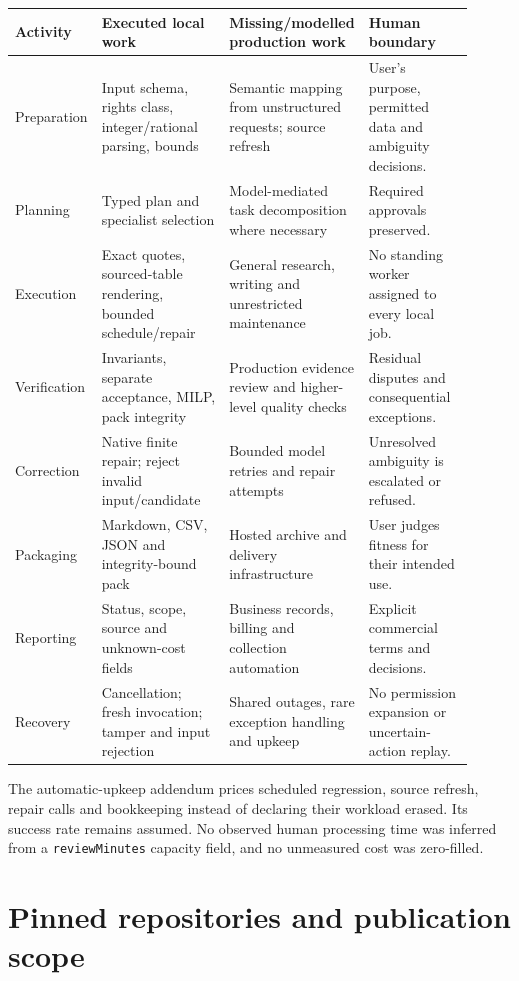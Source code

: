 \begin{longtable}{@{}p{0.14\linewidth}p{0.29\linewidth}p{0.25\linewidth}p{0.23\linewidth}@{}}\toprule
Activity & Executed local work & Missing/modelled production work & Human boundary\\\midrule\endhead
Preparation & Input schema, rights class, integer/rational parsing, bounds & Semantic mapping from unstructured requests; source refresh & User's purpose, permitted data and ambiguity decisions.\\
Planning & Typed plan and specialist selection & Model-mediated task decomposition where necessary & Required approvals preserved.\\
Execution & Exact quotes, sourced-table rendering, bounded schedule/repair & General research, writing and unrestricted maintenance & No standing worker assigned to every local job.\\
Verification & Invariants, separate acceptance, MILP, pack integrity & Production evidence review and higher-level quality checks & Residual disputes and consequential exceptions.\\
Correction & Native finite repair; reject invalid input/candidate & Bounded model retries and repair attempts & Unresolved ambiguity is escalated or refused.\\
Packaging & Markdown, CSV, JSON and integrity-bound pack & Hosted archive and delivery infrastructure & User judges fitness for their intended use.\\
Reporting & Status, scope, source and unknown-cost fields & Business records, billing and collection automation & Explicit commercial terms and decisions.\\
Recovery & Cancellation; fresh invocation; tamper and input rejection & Shared outages, rare exception handling and upkeep & No permission expansion or uncertain-action replay.\\\bottomrule
\end{longtable}

The automatic-upkeep addendum prices scheduled regression, source refresh, repair calls and bookkeeping instead of declaring their workload erased. Its success rate remains assumed. No observed human processing time was inferred from a \texttt{reviewMinutes} capacity field, and no unmeasured cost was zero-filled.

\FloatBarrier
\section{Pinned repositories and publication scope}\label{app:pins}

